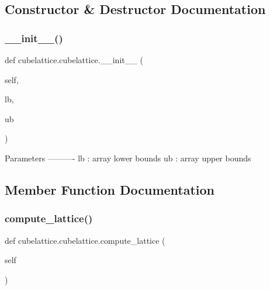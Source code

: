\subsection{Constructor \& Destructor Documentation}
\mbox{\label{classcubelattice_1_1cubelattice_a877800444043a45c73c988fe0b057950}} 
\subsubsection{\texorpdfstring{\+\_\+\+\_\+init\+\_\+\+\_\+()}{\_\_init\_\_()}}
{\footnotesize\ttfamily def cubelattice.\+cubelattice.\+\_\+\+\_\+init\+\_\+\+\_\+ (\begin{DoxyParamCaption}\item[{}]{self,  }\item[{}]{lb,  }\item[{}]{ub }\end{DoxyParamCaption})}

\begin{DoxyVerb}Parameters
----------
lb : array
    lower bounds
ub : array
    upper bounds
\end{DoxyVerb}
 

\subsection{Member Function Documentation}
\mbox{\label{classcubelattice_1_1cubelattice_a8bc4766c57d45c810334d87ad78ca653}} 
\subsubsection{\texorpdfstring{compute\+\_\+lattice()}{compute\_lattice()}}
{\footnotesize\ttfamily def cubelattice.\+cubelattice.\+compute\+\_\+lattice (\begin{DoxyParamCaption}\item[{}]{self }\end{DoxyParamCaption})}


